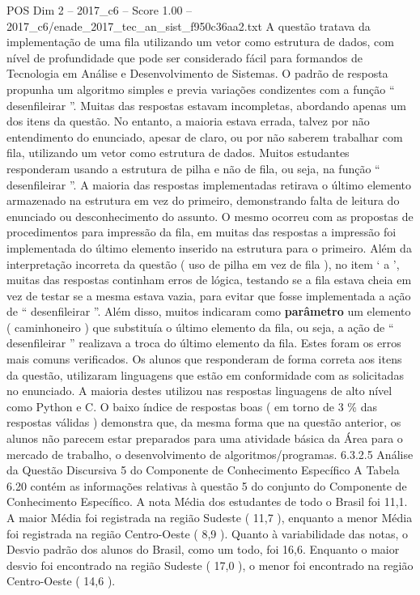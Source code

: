 \begin{textsample}{POS Dim 2 – 2017\_c6 – Score 1.00 – 2017\_c6/enade\_2017\_tec\_an\_sist\_f950c36aa2.txt}
A questão tratava da implementação de uma fila utilizando um vetor como estrutura de dados, com nível de profundidade que pode ser considerado fácil para formandos de Tecnologia em Análise e Desenvolvimento de Sistemas.
O padrão de resposta propunha um algoritmo simples e previa variações condizentes com a função “ desenfileirar ”.
Muitas das respostas estavam incompletas, abordando apenas um dos itens da questão.
No entanto, a maioria estava errada, talvez por não entendimento do enunciado, apesar de claro, ou por não saberem trabalhar com fila, utilizando um vetor como estrutura de dados.
Muitos estudantes responderam usando a estrutura de pilha e não de fila, ou seja, na função “ desenfileirar ”.
A maioria das respostas implementadas retirava o último elemento armazenado na estrutura em vez do primeiro, demonstrando falta de leitura do enunciado ou desconhecimento do assunto.
O mesmo ocorreu com as propostas de procedimentos para impressão da fila, em muitas das respostas a impressão foi implementada do último elemento inserido na estrutura para o primeiro.
Além da interpretação incorreta da questão ( uso de pilha em vez de fila ), no item ‘ a ’, muitas das respostas continham erros de lógica, testando se a fila estava cheia em vez de testar se a mesma estava vazia, para evitar que fosse implementada a ação de “ desenfileirar ”.
Além disso, muitos indicaram como \textbf{parâmetro} um elemento ( caminhoneiro ) que substituía o último elemento da fila, ou seja, a ação de “ desenfileirar ” realizava a troca do último elemento da fila.
Estes foram os erros mais comuns verificados.
Os alunos que responderam de forma correta aos itens da questão, utilizaram linguagens que estão em conformidade com as solicitadas no enunciado.
A maioria destes utilizou nas respostas linguagens de alto nível como Python e C.
O baixo índice de respostas boas ( em torno de 3 \% das respostas válidas ) demonstra que, da mesma forma que na questão anterior, os alunos não parecem estar preparados para uma atividade básica da Área para o mercado de trabalho, o desenvolvimento de algoritmos/programas. 6.3.2.5 Análise da Questão Discursiva 5 do Componente de Conhecimento Específico A Tabela 6.20 contém as informações relativas à questão 5 do conjunto do Componente de Conhecimento Específico.
A nota Média dos estudantes de todo o Brasil foi 11,1.
A maior Média foi registrada na região Sudeste ( 11,7 ), enquanto a menor Média foi registrada na região Centro-Oeste ( 8,9 ).
Quanto à variabilidade das notas, o Desvio padrão dos alunos do Brasil, como um todo, foi 16,6.
Enquanto o maior desvio foi encontrado na região Sudeste ( 17,0 ), o menor foi encontrado na região Centro-Oeste ( 14,6 ).

\end{textsample}
